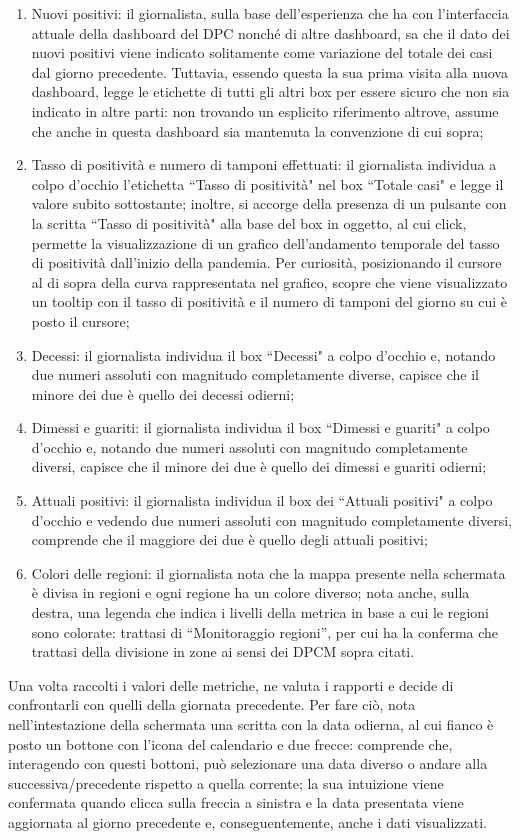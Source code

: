 \begin{enumerate}
    \item Nuovi positivi: il giornalista, sulla base dell'esperienza che ha con l'interfaccia attuale della dashboard del DPC nonché di altre dashboard, sa che il dato dei nuovi positivi viene indicato solitamente come variazione del totale dei casi dal giorno precedente. Tuttavia, essendo questa la sua prima visita alla nuova dashboard, legge le etichette di tutti gli altri box per essere sicuro che non sia indicato in altre parti: non trovando un esplicito riferimento altrove, assume che anche in questa dashboard sia mantenuta la convenzione di cui sopra;
    \item Tasso di positività e numero di tamponi effettuati: il giornalista individua a colpo d'occhio l'etichetta ``Tasso di positività" nel box ``Totale casi" e legge il valore subito sottostante; inoltre, si accorge della presenza di un pulsante con la scritta ``Tasso di positività" alla base del box in oggetto, al cui click, permette la visualizzazione di un grafico dell'andamento temporale del tasso di positività dall'inizio della pandemia. Per curiosità, posizionando il cursore al di sopra della curva rappresentata nel grafico, scopre che viene visualizzato un tooltip con il tasso di positività e il numero di tamponi del giorno su cui è posto il cursore;
    \item Decessi: il giornalista individua il box ``Decessi" a colpo d'occhio e, notando due numeri assoluti con magnitudo completamente diverse, capisce che il minore dei due è quello dei decessi odierni;
    \item Dimessi e guariti: il giornalista individua il box ``Dimessi e guariti" a colpo d'occhio e, notando due numeri assoluti con magnitudo completamente diversi, capisce che il minore dei due è quello dei dimessi e guariti odierni;
    \item Attuali positivi: il giornalista individua il box dei ``Attuali positivi" a colpo d'occhio e vedendo due numeri assoluti con magnitudo completamente diversi, comprende che il maggiore dei due è quello degli attuali positivi;
    \item Colori delle regioni: il giornalista nota che la mappa presente nella schermata è divisa in regioni e ogni regione ha un colore diverso; nota anche, sulla destra, una legenda che indica i livelli della metrica in base a cui le regioni sono colorate: trattasi di ``Monitoraggio regioni'', per cui ha la conferma che trattasi della divisione in zone ai sensi dei DPCM sopra citati. \label{cw1:f}
\end{enumerate}
Una volta raccolti i valori delle metriche, ne valuta i rapporti e decide di confrontarli con quelli della giornata precedente. Per fare ciò, nota nell'intestazione della schermata una scritta con la data odierna, al cui fianco è posto un bottone con l'icona del calendario e due frecce: comprende che, interagendo con questi bottoni, può selezionare una data diverso o andare alla successiva/precedente rispetto a quella corrente; la sua intuizione viene confermata quando clicca sulla freccia a sinistra e la data presentata viene aggiornata al giorno precedente e, conseguentemente, anche i dati visualizzati.


